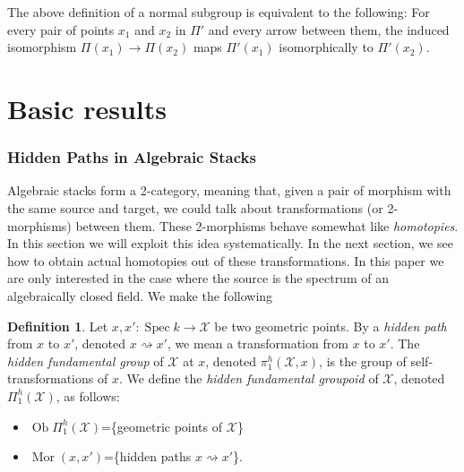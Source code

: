 \documentclass{amsart}
\theoremstyle{definition}
\newtheorem{defn}[thm]{Definition}
\theoremstyle{remark}
\theoremstyle{remark}
\newcommand{\X}{\mathcal{X}}
\newcommand{\rsa}{\rightsquigarrow}
\newcommand{\PhX}{\Pi_1^{h}(\X)}
\newcommand{\phX}{\pi_1^{h}(\X,x)}
\let\:=\colon
\newcommand{\Spec}{\operatorname{Spec}}
\newcommand{\Ob}{\operatorname{Ob}}
\newcommand{\Mor}{\operatorname{Mor}}
\begin{document}
The above definition of a normal subgroup is equivalent to the
following: For every pair of points $x_1$ and $x_2$ in $\Pi'$ and
every arrow between them, the induced isomorphism $\Pi(x_1) \to
\Pi(x_2)$ maps $\Pi'(x_1)$ isomorphically to $\Pi'(x_2)$.

\pagebreak

{\LARGE\part{Basic results}}{\label{C:basic}}

\vspace{0.5in}

\section{Hidden Paths in Algebraic Stacks}

Algebraic stacks form a 2-category, meaning that, given a pair of
morphism with the same source and target, we could talk about
transformations (or 2-morphisms) between them. These 2-morphisms
behave somewhat like {\em homotopies}. In this section we will
exploit this idea systematically. In the next section, we see how
to obtain actual homotopies out of these transformations. In this
paper we are only interested in the case where the source is the
spectrum of an algebraically closed field. We make the following

\begin{defn}{\label{D:hidden}}
Let $x, x' \: \Spec k \to \X$ be two geometric points. By a {\sl
hidden path} from $x$ to $x'$, denoted $x \rsa x'$, we mean a
transformation from $x$ to $x'$. The {\sl hidden fundamental
group} of $\X$ at $x$, denoted $\phX$, is the group of
self-transformations of $x$. We define the {\sl hidden fundamental
groupoid} of $\X$, denoted $\PhX$, as follows:

\begin{itemize}
\item $\Ob \PhX$=\{geometric points of $\X$\}
\item $\Mor(x,x')$=\{hidden paths $x \rsa x'$\}.
\end{itemize}
\end{defn}
\end{document}
